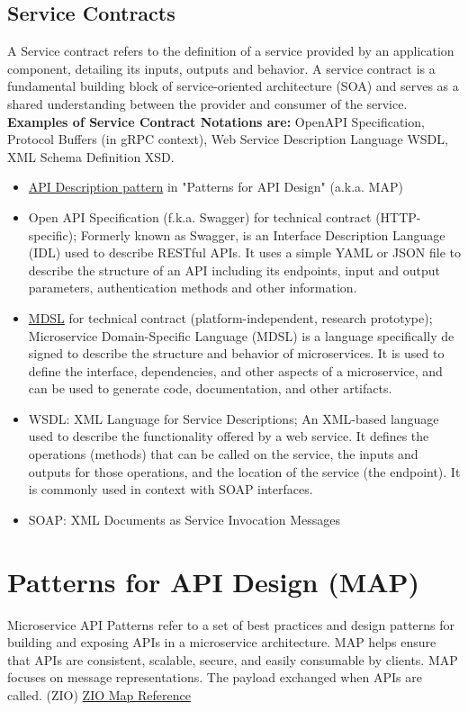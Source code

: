 \documentclass[../Main.tex]{subfiles}
\begin{document}
\subsection{Service Contracts}
A Service contract refers to the definition of a service provided by an application component, detailing its inputs,
outputs and behavior. A service contract is a fundamental building block of service-oriented architecture (SOA) and
serves as a shared understanding between the provider and consumer of the service.
\textbf{Examples of Service Contract Notations are:} OpenAPI Specification, Protocol Buffers (in gRPC context), Web
Service Description Language WSDL, XML Schema Definition XSD.
\begin{itemize}
    \item \href{https://microservice-api-patterns.org/patterns/foundation/APIDescription.html}{API Description pattern}
    in "Patterns for API Design" (a.k.a. MAP)
    \item Open API Specification (f.k.a. Swagger) for technical contract (HTTP-specific);
    Formerly known as Swagger, is an Interface Description Language (IDL) used
    to describe RESTful APIs. It uses a simple YAML or JSON file to describe the structure of an API including its
    endpoints, input and output parameters, authentication methods and other information.
    \item \href{https://microservice-api-patterns.github.io/MDSL-Specification/}{MDSL}
    for technical contract (platform-independent, research prototype);
    Microservice Domain-Specific Language (MDSL) is a language specifically de
    signed to describe the structure and behavior of microservices. It is used to define
    the interface, dependencies, and other aspects of a microservice, and can be used
    to generate code, documentation, and other artifacts.
    \item WSDL: XML Language for Service Descriptions;
    An XML-based language used
    to describe the functionality offered by a web service. It defines the operations
    (methods) that can be called on the service, the inputs and outputs for those
    operations, and the location of the service (the endpoint). It is commonly used in
    context with SOAP interfaces.
    \item SOAP: XML Documents as Service Invocation Messages
\end{itemize}
\section{Patterns for API Design (MAP)}
Microservice API Patterns refer to a set of best practices and design patterns for building and exposing APIs in a
 microservice architecture. MAP helps ensure that APIs are consistent, scalable, secure, and easily consumable by
clients. MAP focuses on message representations. The payload exchanged when APIs are called. (ZIO)
\href{https://api-patterns.org/quickstart-resources}{ZIO Map Reference}
\end{document}
